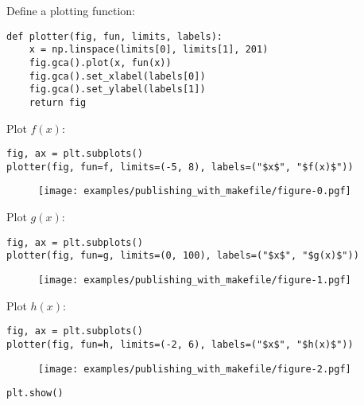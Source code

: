 Define a plotting function:

\label{d49ccae9}
\nointerlineskip\nointerlineskip\begin{verbatim}
def plotter(fig, fun, limits, labels):
    x = np.linspace(limits[0], limits[1], 201)
    fig.gca().plot(x, fun(x))
    fig.gca().set_xlabel(labels[0])
    fig.gca().set_ylabel(labels[1])
    return fig
\end{verbatim}

\label{1f9cc092}
Plot $f(x)$:

\label{ae14fca3}
\nointerlineskip\nointerlineskip\begin{verbatim}
fig, ax = plt.subplots()
plotter(fig, fun=f, limits=(-5, 8), labels=("$x$", "$f(x)$"))
\end{verbatim}

\label{76f34bb1}
\gdef\graphicslist{}%
\begin{figure}[htbp]
\centering
\texttt{[image: examples/publishing\_with\_makefile/figure-0.pgf]}
\caption{}
\label{fig:publishing_with_makefile-figure-0}
\end{figure}

\label{6e605b5e}
Plot $g(x)$:

\label{3049ff64}
\nointerlineskip\nointerlineskip\begin{verbatim}
fig, ax = plt.subplots()
plotter(fig, fun=g, limits=(0, 100), labels=("$x$", "$g(x)$"))
\end{verbatim}

\label{fd4bfb5d}
\gdef\graphicslist{}%
\begin{figure}[htbp]
\centering
\texttt{[image: examples/publishing\_with\_makefile/figure-1.pgf]}
\caption{}
\label{fig:publishing_with_makefile-figure-1}
\end{figure}

\label{4a022c7a}
Plot $h(x)$:

\label{feea135a}
\nointerlineskip\nointerlineskip\begin{verbatim}
fig, ax = plt.subplots()
plotter(fig, fun=h, limits=(-2, 6), labels=("$x$", "$h(x)$"))
\end{verbatim}

\label{e940f698}
\gdef\graphicslist{}%
\begin{figure}[htbp]
\centering
\texttt{[image: examples/publishing\_with\_makefile/figure-2.pgf]}
\caption{}
\label{fig:publishing_with_makefile-figure-2}
\end{figure}

\label{e2ab5739}
\nointerlineskip\nointerlineskip\begin{verbatim}
plt.show()
\end{verbatim}
